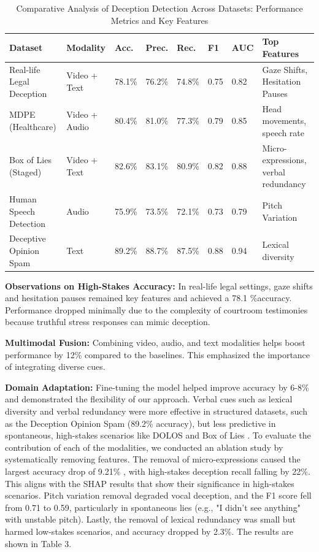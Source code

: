 \documentclass{article} %
\begin{document}
\begin{table}[htbp]
\centering
\footnotesize
\renewcommand{\arraystretch}{1.3}
\begin{tabular}{p{2cm} p{1.1cm} l l l l l p{3cm}}
\hline
\textbf{Dataset} & \textbf{Modality} & \textbf{Acc.} & \textbf{Prec.} &\textbf{ Rec.} & \textbf{F1} & \textbf{AUC} & \textbf{Top Features} \\
\hline
Real-life Legal Deception & Video + Text & 78.1\% & 76.2\% & 74.8\% & 0.75 & 0.82 & Gaze Shifts, Hesitation Pauses \\
MDPE (Healthcare) & Video + Audio & 80.4\% & 81.0\% & 77.3\% & 0.79 & 0.85 & Head movements, speech rate \\
Box of Lies (Staged) & Video + Text & 82.6\% & 83.1\% & 80.9\% & 0.82 & 0.88 & Micro-expressions, verbal redundancy \\
Human Speech Detection & Audio & 75.9\% & 73.5\% & 72.1\% & 0.73 & 0.79 & Pitch Variation \\
Deceptive Opinion Spam & Text & 89.2\% & 88.7\% & 87.5\% & 0.88 & 0.94 & Lexical diversity \\
\hline 
\end{tabular}
\caption{Comparative Analysis of Deception Detection Across Datasets: Performance Metrics and Key Features}
\label{tab:dataset_comparison}
\end{table}

\textbf{Observations on High-Stakes Accuracy:} In real-life legal settings, gaze shifts and hesitation pauses remained key features and achieved a 78.1 \%accuracy. Performance dropped minimally due to the complexity of courtroom testimonies because truthful stress responses can mimic deception. 

\textbf{Multimodal Fusion:} Combining video, audio, and text modalities helps boost performance by 12\% compared to the baselines. This emphasized the importance of integrating diverse cues. 

\textbf{Domain} \textbf{Adaptation:} Fine-tuning the model helped improve accuracy by 6-8\% and demonstrated the flexibility of our approach. Verbal cues such as lexical diversity and verbal redundancy were more effective in structured datasets, such as the Deception Opinion Spam \citep{ott2011finding} (89.2\% accuracy), but less predictive in spontaneous, high-stakes scenarios like DOLOS and Box of Lies \citep{soldner2019box}. To evaluate the contribution of each of the modalities, we conducted an ablation study by systematically removing features. The removal of micro-expressions caused the largest accuracy drop of 9.21\% , with high-stakes deception recall falling by 22\%. This aligns with the SHAP results that show their significance in high-stakes scenarios. Pitch variation removal degraded vocal deception, and the F1 score fell from 0.71 to 0.59, particularly in spontaneous lies (e.g., "I didn't see anything" with unstable pitch). Lastly, the removal of lexical redundancy was small but harmed low-stakes scenarios, and accuracy dropped by 2.3\%. The results are shown in Table 3. 
\end{document}
